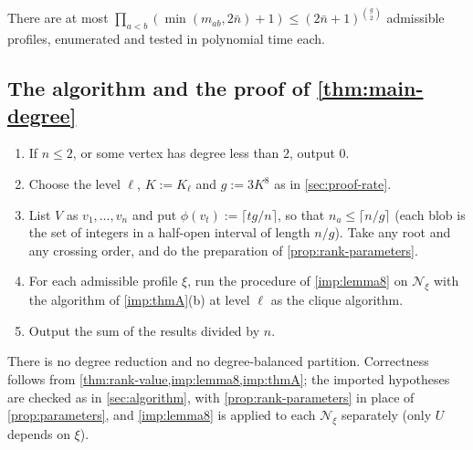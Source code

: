 \documentclass[11pt]{amsart}
\theoremstyle{plain}
\theoremstyle{definition}
\theoremstyle{remark}
\numberwithin{equation}{section}
\begin{document}
There are at most $\prod_{a<b}(\min(m_{ab},2\bar n)+1)\le(2\bar n+1)^{\binom g2}$ admissible profiles,
enumerated and tested in polynomial time each.

\subsection{The algorithm and the proof of \texorpdfstring{\cref{thm:main-degree}}{Theorem 1.3}}
\begin{enumerate}[label=\textbf{Step \arabic*.},leftmargin=*,start=0]
\item If $n\le2$, or some vertex has degree less than $2$, output $0$.
\item Choose the level $\ell$, $K:=K_\ell$ and $g:=3K^8$ as in \cref{sec:proof-rate}.
\item List $V$ as $v_1,\dots,v_n$ and put $\phi(v_t):=\lceil tg/n\rceil$, so that $n_a\le\lceil n/g\rceil$
(each blob is the set of integers in a half-open interval of length $n/g$). Take any root and any
crossing order, and do the preparation of \cref{prop:rank-parameters}.
\item For each admissible profile $\xi$, run the procedure of \cref{imp:lemma8} on $\mathcal N_\xi$
with the algorithm of \cref{imp:thmA}(b) at level $\ell$ as the clique algorithm.
\item Output the sum of the results divided by $n$.
\end{enumerate}
There is no degree reduction and no degree-balanced partition. Correctness follows from
\cref{thm:rank-value,imp:lemma8,imp:thmA}; the imported hypotheses are checked as in
\cref{sec:algorithm}, with \cref{prop:rank-parameters} in place of \cref{prop:parameters}, and
\cref{imp:lemma8} is applied to each $\mathcal N_\xi$ separately (only $U$ depends on $\xi$).
\end{document}
